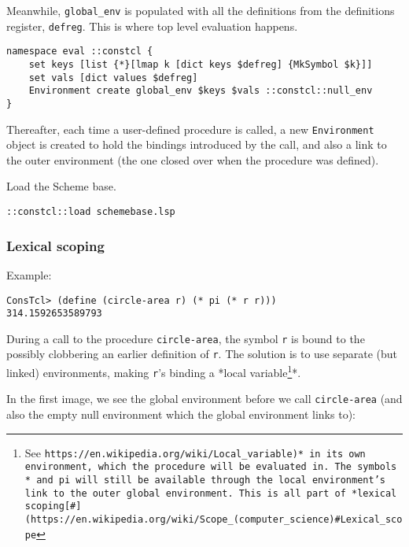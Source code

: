 \documentclass{report}
\begin{document}
Meanwhile, \texttt{global\_env} is populated with all the definitions from the definitions register, \texttt{defreg}. This is where top level evaluation happens.

\noindent\makebox[\linewidth]{\rule{\linewidth}{0.4pt}}
\begin{lstlisting}
namespace eval ::constcl {
    set keys [list {*}[lmap k [dict keys $defreg] {MkSymbol $k}]]
    set vals [dict values $defreg]
    Environment create global_env $keys $vals ::constcl::null_env
}
\end{lstlisting}
\noindent\makebox[\linewidth]{\rule{\linewidth}{0.4pt}}

Thereafter, each time a user-defined procedure is called, a new \texttt{Environment} object is created to hold the bindings introduced by the call, and also a link to the outer environment (the one closed over when the procedure was defined).


Load the Scheme base.

\noindent\makebox[\linewidth]{\rule{\linewidth}{0.4pt}}
\begin{lstlisting}
::constcl::load schemebase.lsp
\end{lstlisting}
\noindent\makebox[\linewidth]{\rule{\linewidth}{0.4pt}}
\subsubsection{Lexical scoping}
\label{lexical-scoping}

Example:

\noindent\makebox[\linewidth]{\rule{\linewidth}{0.4pt}}
\begin{lstlisting}
ConsTcl> (define (circle-area r) (* pi (* r r)))
314.1592653589793
\end{lstlisting}
\noindent\makebox[\linewidth]{\rule{\linewidth}{0.4pt}}

During a call to the procedure \texttt{circle-area}, the symbol \texttt{r} is bound to the possibly clobbering an earlier definition of \texttt{r}. The solution is to use separate (but linked) environments, making \texttt{r}'s binding a *local variable\footnote{See \texttt{https://en.wikipedia.org/wiki/Local\_variable)* in its own environment, which the procedure will be evaluated in. The symbols \texttt{*} and \texttt{pi} will still be available through the local environment's link to the outer global environment. This is all part of *lexical scoping[\#](https://en.wikipedia.org/wiki/Scope\_(computer\_science)\#Lexical\_scope}}*.


In the first image, we see the global environment before we call \texttt{circle-area} (and also the empty null environment which the global environment links to):
\end{document}
